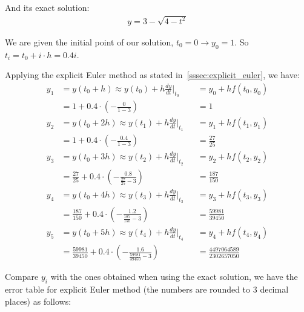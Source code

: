 \documentclass[a4paper]{article}
\numberwithin{equation}{section}
\begin{document}
And its exact solution:
\begin{align*}
  y = 3 - \sqrt{4-t^2}
\end{align*}

We are given the initial point of our solution, \(t_0 = 0 \rightarrow y_0 = 1\). So \(t_i = t_0 + i \cdot h = 0.4i\).

Applying the explicit Euler method as stated in~\ref{sssec:explicit_euler}, we have:
\begin{align*}
  y_1 & = y(t_0 + h) \approx y(t_0) + h\frac{dy}{dt}\biggr|_{t_0}                           &  & = y_0 + hf(t_0, y_0)            \\
      & = 1 + 0.4 \cdot \left(-\frac{0}{1-3}\right)                                         &  & = 1                             \\
  y_2 & = y(t_0 + 2h) \approx y(t_1) + h\frac{dy}{dt}\biggr|_{t_1}                          &  & = y_1 + hf(t_1, y_1)            \\
      & = 1 + 0.4 \cdot \left(-\frac{0.4}{1-3}\right)                                       &  & = \frac{27}{25}                 \\
  y_3 & = y(t_0 + 3h) \approx y(t_2) + h\frac{dy}{dt}\biggr|_{t_2}                          &  & = y_2 + hf(t_2, y_2)            \\
      & = \frac{27}{25} + 0.4 \cdot \left(-\frac{0.8}{\frac{27}{25} - 3}\right)             &  & = \frac{187}{150}               \\
  y_4 & = y(t_0 + 4h) \approx y(t_3) + h\frac{dy}{dt}\biggr|_{t_3}                          &  & = y_3 + hf(t_3, y_3)            \\
      & = \frac{187}{150} + 0.4 \cdot \left(-\frac{1.2}{\frac{187}{150} - 3}\right)         &  & = \frac{59981}{39450}           \\
  y_5 & = y(t_0 + 5h) \approx y(t_4) + h\frac{dy}{dt}\biggr|_{t_4}                          &  & = y_4 + hf(t_4, y_4)            \\
      & = \frac{59981}{39450} + 0.4 \cdot \left(-\frac{1.6}{\frac{59981}{39450} - 3}\right) &  & = \frac{4497064589}{2302657050}
\end{align*}

Compare \(y_i\) with the ones obtained when using the exact solution, we have the error table for explicit Euler method (the numbers are rounded to 3 decimal places) as follows:
\end{document}
